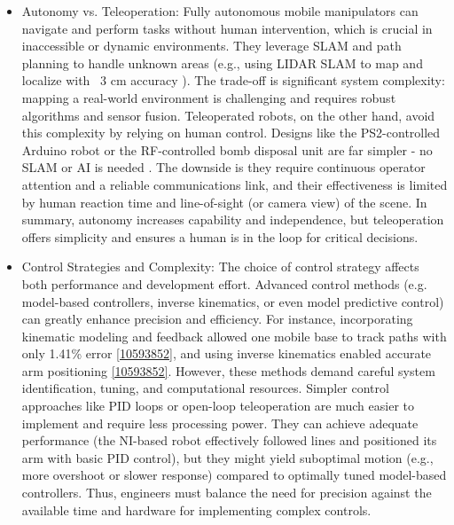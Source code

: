 \documentclass{article}
\begin{document}
\begin{itemize}
  
  \item Autonomy vs. Teleoperation: Fully autonomous mobile manipulators can navigate and perform tasks without human intervention, which is crucial in inaccessible or dynamic environments. They leverage SLAM and path planning to handle unknown areas (e.g., using LIDAR SLAM to map and localize with ~3 cm accuracy \cite{8710464}). The trade-off is significant system complexity: mapping a real-world environment is challenging \cite{7475009} and requires robust algorithms and sensor fusion. Teleoperated robots, on the other hand, avoid this complexity by relying on human control. Designs like the PS2-controlled Arduino robot or the RF-controlled bomb disposal unit are far simpler - no SLAM or AI is needed \cite{6805994}. The downside is they require continuous operator attention and a reliable communications link, and their effectiveness is limited by human reaction time and line-of-sight (or camera view) of the scene. In summary, autonomy increases capability and independence, but teleoperation offers simplicity and ensures a human is in the loop for critical decisions.
  
  \item Control Strategies and Complexity: The choice of control strategy affects both performance and development effort. Advanced control methods (e.g. model-based controllers, inverse kinematics, or even model predictive control) can greatly enhance precision and efficiency. For instance, incorporating kinematic modeling and feedback allowed one mobile base to track paths with only 1.41\% error \ref{10593852}, and using inverse kinematics enabled accurate arm positioning \ref{10593852}. However, these methods demand careful system identification, tuning, and computational resources. Simpler control approaches like PID loops or open-loop teleoperation are much easier to implement and require less processing power. They can achieve adequate performance (the NI-based robot effectively followed lines and positioned its arm with basic PID control), but they might yield suboptimal motion (e.g., more overshoot or slower response) compared to optimally tuned model-based controllers. Thus, engineers must balance the need for precision against the available time and hardware for implementing complex controls.
  

\end{itemize}
\end{document}
